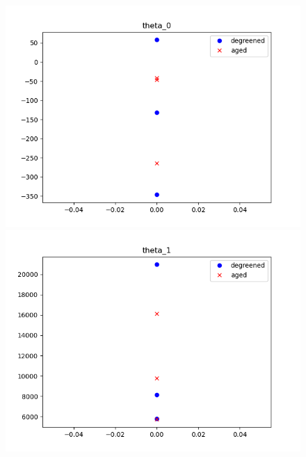 \begin{figure}[H]
        \begin{minipage}{0.33\textwidth}
                \includegraphics[width = \textwidth]{./figs/figs_new_mdl/theta_0.png}
        \end{minipage}
        \begin{minipage}{0.33\textwidth}
                \includegraphics[width = \textwidth]{./figs/figs_new_mdl/theta_1.png}
        \end{minipage}
        \begin{minipage}{0.33\textwidth}

\end{minipage}
\end{figure}
